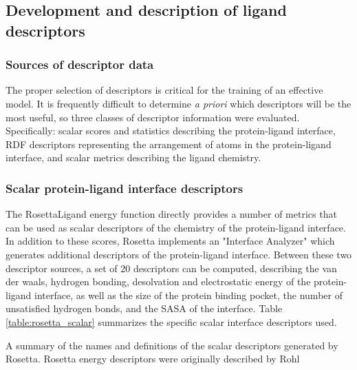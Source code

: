 \subsection{Development and description of ligand descriptors}
\label{subsec:descriptor_development}
\subsubsection{Sources of descriptor data} 

The proper selection of descriptors is critical for the training of an effective model.
It is frequently difficult to determine \textit{a priori} which descriptors will be the most useful, so three classes of descriptor information were evaluated.  Specifically: scalar scores and statistics describing the protein-ligand interface,  \ac{RDF} descriptors representing the arrangement of atoms in the protein-ligand interface, and scalar metrics describing the ligand chemistry.

\subsubsection{Scalar protein-ligand interface descriptors}
\label{subsubsec:scalar_rosetta}
The RosettaLigand energy function directly provides a number of metrics that can be used as scalar descriptors of the chemistry of the protein-ligand interface.
In addition to these scores, Rosetta implements an "Interface Analyzer" which generates additional descriptors of the protein-ligand interface.
Between these two descriptor sources, a set of 20 descriptors can be computed, describing the van der waals, hydrogen bonding, desolvation and electrostatic energy of the protein-ligand interface, as well as the size of the protein binding pocket, the number of unsatisfied hydrogen bonds, and the \ac{SASA} of the interface.
Table \ref{table:rosetta_scalar} summarizes the specific scalar interface descriptors used.
\begin{table}
\scriptsize
\renewcommand{\tabcolsep}{0.09cm}
\centering

\caption{A summary of the names and definitions of the scalar descriptors generated by Rosetta.
Rosetta energy descriptors were originally described by Rohl \citep{Rohl:2004dh} }
\label{table:rosetta_scalar}
\end{table}

